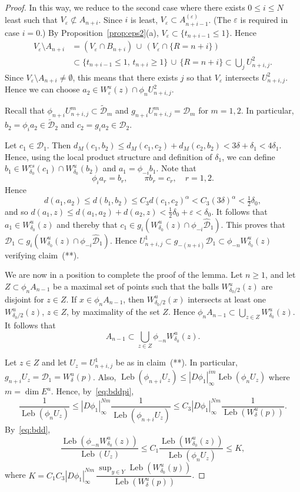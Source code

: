 \documentclass[10pt,a4paper]{amsart}
\newcommand{\Leb}{\operatorname{Leb}}
\newcommand{\cD}{{\mathcal D}}
\newcommand{\eps}{\varepsilon}
\newcommand{\hcD}{{\widehat {\mathcal D}}}
\newcommand{\tcD}{{\widetilde {\mathcal D}}}
\begin{document}
\begin{proof}
In this way, we reduce to the second case where there exists $0\le i\le N$ least such that
$V_\eps\not\subset A_{n+i}$.
Since $i$ is least, 
$V_\eps\subset A_{n+i-1}^{(\eps)}$. (The $\eps$ is required in case $i=0$.)
By Proposition~\ref{prop:eps2}(a),
$V_\eps\subset\{t_{n+i-1}\le 1\}$.
Hence
\[
\begin{split}
V_\eps\setminus A_{n+i}
& =(V_\eps\cap B_{n+i})\,\cup\,(V_\eps\cap \{R=n+i\})
\\ & \subset\{t_{n+i-1}\le 1,\,t_{n+i}\ge1\}\,\cup\, \{R=n+i\}
\subset\bigcup_j U_{n+i,j}^2.
\end{split}
\]
Since $V_\eps\setminus A_{n+i}\neq\emptyset$, 
this means that there exists $j$ so that
$V_\eps$ intersects $U_{n+i,j}^2$.
Hence we can choose $a_2\in W^u_\eps(z)\cap \phi_n U_{n+i,j}^2$.

Recall that $\phi_{n+i}U_{n+i,j}^m \subset \tcD_m$ 
and $g_{n+i}U_{n+i,j}^m = \cD_m$ for $m=1,2$.
In particular, $b_2=\phi_ia_2\in \tcD_2$ and $c_2=g_ia_2\in \cD_2$.

Let $c_1\in\cD_1$.
Then $d_M(c_1,b_2)\le d_M(c_1,c_2)+d_M(c_2,b_2)<3\delta+\delta_1<4\delta_1$. Hence,
using the local product structure and definition of $\delta_1$,  we can define $b_1\in W^{cs}_{\delta_0}(c_1)\cap W^u_{\delta_0}(b_2)$ and $a_1=\phi_{-i}b_1$.
Note that
\[
\phi_ia_r=b_r,\qquad \pi b_r=c_r, \quad r=1,2.
\]
Hence
\[
d(a_1,a_2)\le d(b_1,b_2)\le C_3d(c_1,c_2)^\alpha<C_3(3\delta)^\alpha<\tfrac12\delta_0,
\]
and so $d(a_1,z)\le d(a_1,a_2)+d(a_2,z)<\frac12\delta_0+\eps<\delta_0$.
It follows that
$a_1\in W^u_{\delta_0}(z)$ and thereby that
$c_1\in g_i(W^u_{\delta_0}(z)\cap \phi_{-i}\hcD_1)$.
This proves that $\cD_1\subset g_i(W^u_{\delta_0}(z)\cap \phi_{-i}\hcD_1)$.
Hence $U_{n+i,j}^1\subset g_{-(n+i)}\cD_1\subset \phi_{-n}W^u_{\delta_0}(z)$ verifying claim~(**).

 \vspace{1ex}
We are now in a position to complete the proof of the lemma.
Let $n\ge1$, and let $Z\subset \phi_nA_{n-1}$ be a maximal set of points such that
the balls $W^u_{\delta_0/2}(z)$ are disjoint for $z\in Z$.
If $x\in \phi_nA_{n-1}$, then $W^u_{\delta_0/2}(x)$ intersects at least one
$W^u_{\delta_0/2}(z)$, $z\in Z$, by maximality of the set $Z$. Hence
$\phi_nA_{n-1}\subset \bigcup_{z\in Z}W^u_{\delta_0}(z)$.
It follows that
\[
A_{n-1}\subset \bigcup_{z\in Z}\phi_{-n}W^u_{\delta_0}(z).
\]

Let $z\in Z$ and let $U_z=U_{n+i,j}^1$ be as in claim~(**).
In particular, $g_{n+i}U_z=\cD_1=W^u_\delta(p)$.
Also, $\Leb(\phi_{n+i}U_z)\le 
|D\phi_1|_\infty^{im}\Leb(\phi_nU_z)$
where $m=\dim E^u$.
Hence, by~\eqref{eq:bddpi}, 
\[
\frac{1}{\Leb(\phi_nU_z)}\le |D\phi_1|_\infty^{Nm}\frac{1}{\Leb(\phi_{n+i}U_z)}
\le C_3 |D\phi_1|_\infty^{Nm}\frac{1}{\Leb(W^u_\delta(p))}.
\]
By~\eqref{eq:bdd}, 
\[
\frac{\Leb(\phi_{-n}W^u_{\delta_0}(z))}{\Leb(U_z)}
\le C_1
\frac{\Leb(W^u_{\delta_0}(z))}{\Leb(\phi_nU_z)}
\le 
K,
\]
where $K=C_1C_3|D\phi_1|_\infty^{Nm}\,\dfrac{\sup_{y\in Y}\Leb(W^u_{\delta_0}(y))}{\Leb(W^u_\delta(p))}$.


\end{proof}
\end{document}

